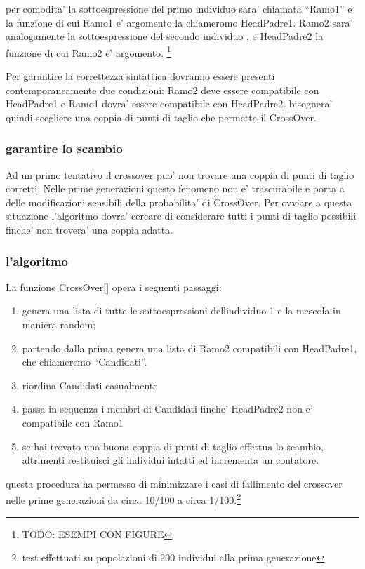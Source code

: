 \documentclass[12pt, a4paper]{article}
\begin{document}
per comodita' la sottoespressione del primo individuo sara' chiamata ``Ramo1'' e la funzione di cui Ramo1 e' argomento la chiameromo HeadPadre1.
Ramo2 sara' analogamente la sottoespressione del secondo individuo , e HeadPadre2 la funzione di cui Ramo2 e' argomento.
\footnote{TODO: ESEMPI CON FIGURE}

Per garantire la correttezza sintattica dovranno essere presenti contemporaneamente due condizioni:
Ramo2 deve essere compatibile con HeadPadre1 e Ramo1 dovra' essere compatibile con HeadPadre2.
bisognera' quindi scegliere una coppia di punti di taglio che permetta il CrossOver.

\subsubsection{garantire lo scambio}
Ad un primo tentativo il crossover puo' non trovare una coppia di punti di taglio corretti. Nelle prime generazioni questo fenomeno non e' trascurabile e porta a delle modificazioni sensibili della probabilita' di CrossOver. Per ovviare a questa situazione l'algoritmo dovra' cercare di considerare tutti i punti di taglio possibili finche' non trovera' una coppia adatta.

\subsubsection{l'algoritmo}
La funzione CrossOver[] opera i seguenti passaggi:
\begin{enumerate}
\item genera una lista di tutte le sottoespressioni dellindividuo 1 e la mescola in maniera random;
\item partendo dalla prima genera una lista di Ramo2 compatibili con HeadPadre1, che chiameremo ``Candidati''.
\item riordina Candidati casualmente
\item passa in sequenza i membri di Candidati finche' HeadPadre2 non e' compatibile con Ramo1
\item se hai trovato una buona coppia di punti di taglio effettua lo scambio, altrimenti restituisci gli individui intatti ed incrementa un contatore.
\end{enumerate}

questa procedura ha permesso di minimizzare i casi di fallimento del crossover nelle prime generazioni da circa 10/100 a circa 1/100.\footnote{test effettuati su popolazioni di 200 individui alla prima generazione}
\end{document}
